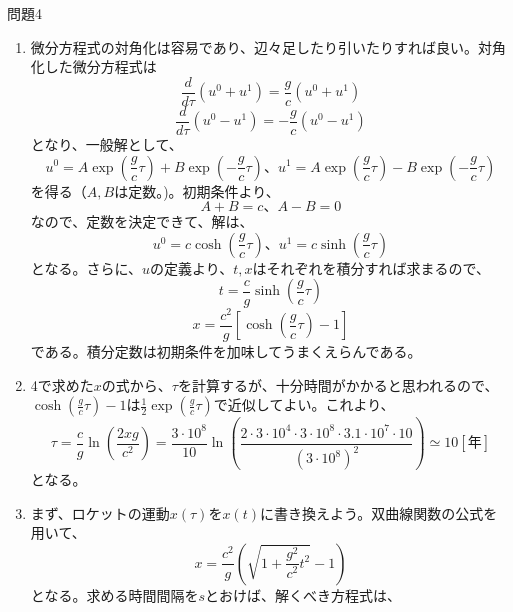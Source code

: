\documentclass[fleqn]{jbook}
\begin{document}
\begin{answer}{問題4}{}
\begin{enumerate}
運動方程式を導くために使う式は、
\begin{equation}
(u^0+u^1)(u^0-u^1) = c^2 
\end{equation}
\begin{equation}
\frac{u^0}{a^1} = \frac{u^1}{a^0}  
\end{equation}
\begin{equation}
(a^0+a^1)(a^0-a^1) = -g^2   
\end{equation}
である（指示されている式を変形しただけ）。ここで、(1)と(3)の比を取って、
$$ \frac{u^1+u^0}{a^0+a^1}\frac{u^1-u^0}{a^0-a^1} = \frac{c^2}{g^2} $$
となるが、(2)と加比の理より、
$$ \left(\frac{u^0}{a^1}\right)^2 = \left(\frac{u^1}{a^0}\right)^2 = \left(\frac{c}{g}\right)^2 $$
を得る。符号をうまく取れば、答えの運動方程式、
$$ 	\frac{du^0(\tau)}{d\tau} = \frac{g}{c}u^1(\tau)　\frac{du^1(\tau)}{d\tau} = \frac{g}{c}u^0(\tau)$$
が導かれる\footnote{符号であるが、(2)の条件から	複号同順で$u$と$a$の符号が同じか違うかまでは求まる。$g$の定義を考えればこの答えがふさわしいことは自明である。なぜ符合の紛れが生じたかであるが、用いたのはローレンツスカラーの式のみである。ローレンツスカラーは符号反転に対して不変であるので、符号反転した運動方程式も導かれたわけである。}。
\item 微分方程式の対角化は容易であり、辺々足したり引いたりすれば良い。対角化した微分方程式は
$$ \frac{d}{d\tau}(u^0+u^1) = \frac{g}{c}(u^0+u^1)$$
$$ \frac{d}{d\tau}(u^0-u^1) = -\frac{g}{c}(u^0-u^1)$$
となり、一般解として、
$$ u^0 = A\exp(\frac{g}{c}\tau) + B\exp(-\frac{g}{c}\tau)、　u^1 = A\exp(\frac{g}{c}\tau) - B\exp(-\frac{g}{c}\tau) $$
を得る（$A,B$は定数。)。初期条件より、
$$ A+B =c、　A-B = 0 $$ 
なので、定数を決定できて、解は、
$$ u^0 = c\cosh(\frac{g}{c}\tau)、　u^1 = c\sinh(\frac{g}{c}\tau) $$
となる。さらに、$u$の定義より、$t,x$はそれぞれを積分すれば求まるので、
$$ t = \frac{c}{g}\sinh(\frac{g}{c}\tau)$$
$$ x = \frac{c^2}{g}\left[\cosh(\frac{g}{c}\tau) -1\right] $$
である。積分定数は初期条件を加味してうまくえらんである。
\item 4で求めた$x$の式から、$\tau$を計算するが、十分時間がかかると思われるので、$\cosh(\frac{g}{c}\tau)-1$は$\frac{1}{2}\exp(\frac{g}{c}\tau)$で近似してよい。これより、
$$ \tau = \frac{c}{g}\ln\left(\frac{2xg}{c^2}\right) = \frac{3\cdot10^8}{10}\ln\left(\frac{2\cdot3\cdot10^4\cdot3\cdot10^8\cdot3.1\cdot10^7\cdot10}{(3\cdot10^8)^2}\right) \simeq 10 [年] $$
となる。
\item まず、ロケットの運動$x(\tau)$を$x(t)$に書き換えよう。双曲線関数の公式を用いて、
$$ x = \frac{c^2}{g}\left(\sqrt{1+\frac{g^2}{c^2}t^2}-1\right)$$
となる。求める時間間隔を$s$とおけば、解くべき方程式は、

\end{enumerate}
\end{answer}
\end{document}
